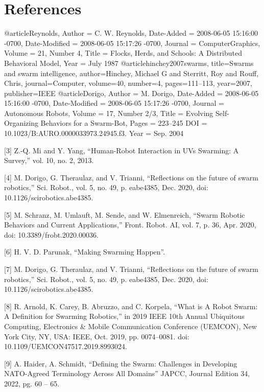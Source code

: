 \section*{References}

@article{Reynolds,
	Author = { C. W. Reynolds},
	Date-Added = {2008-06-05 15:16:00 -0700},
	Date-Modified = {2008-06-05 15:17:26 -0700},
	Journal = {ComputerGraphics},
	Volume = {21, Number 4},
	Title = {Flocks, Herds, and Schools: A Distributed Behavioral Model},
	Year = {July 1987}}
@article{hinchey2007swarms,
  title={Swarms and swarm intelligence},
  author={Hinchey, Michael G and Sterritt, Roy and Rouff, Chris},
  journal={Computer},
  volume={40},
  number={4},
  pages={111--113},
  year={2007},
  publisher={IEEE}
}
@article{Dorigo,
	Author = {M. Dorigo},
	Date-Added = {2008-06-05 15:16:00 -0700},
	Date-Modified = {2008-06-05 15:17:26 -0700},
	Journal = {Autonomous Robots},
	Volume = {17, Number 2/3},
	Title = {Evolving Self-Organizing Behaviors for a Swarm-Bot},
        Pages = {223–245}
        DOI = {10.1023/B:AURO.0000033973.24945.f3.}
	Year = {Sep. 2004}}


[3] Z.-Q. Mi and Y. Yang, “Human-Robot Interaction in UVs Swarming: A Survey,” vol. 10, no. 2, 2013.


[4] M. Dorigo, G. Theraulaz, and V. Trianni, “Reflections on the future of swarm robotics,” Sci. Robot., vol. 5, no. 49, p. eabe4385, Dec. 2020, doi: 10.1126/scirobotics.abe4385.


[5] M. Schranz, M. Umlauft, M. Sende, and W. Elmenreich, “Swarm Robotic Behaviors and Current Applications,” Front. Robot. AI, vol. 7, p. 36, Apr. 2020, doi: 10.3389/frobt.2020.00036.


[6] H. V. D. Parunak, “Making Swarming Happen”.


[7] M. Dorigo, G. Theraulaz, and V. Trianni, “Reflections on the future of swarm robotics,” Sci. Robot., vol. 5, no. 49, p. eabe4385, Dec. 2020, doi: 10.1126/scirobotics.abe4385.


[8] R. Arnold, K. Carey, B. Abruzzo, and C. Korpela, “What is A Robot Swarm: A Definition for Swarming Robotics,” in 2019 IEEE 10th Annual Ubiquitous Computing, Electronics & Mobile Communication Conference (UEMCON), New York City, NY, USA: IEEE, Oct. 2019, pp. 0074–0081. doi: 10.1109/UEMCON47517.2019.8993024.


[9] A. Haider, A. Schmidt, “Defining the Swarm: Challenges in Developing NATO-Agreed Terminology Across All Domains” JAPCC, Journal Edition 34, 2022, pg. 60 – 65.


